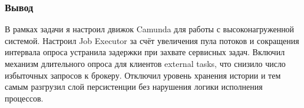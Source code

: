 \subsubsection{Вывод}

В рамках задачи я настроил движок Camunda для работы с высоконагруженной системой.
Настроил Job Executor за счёт увеличения пула потоков и сокращения интервала опроса устранила задержки при захвате сервисных задач.
Включил механизм длительного опроса для клиентов external tasks, что снизило число избыточных запросов к брокеру.
Отключил уровень хранения истории и тем самым разгрузил слой персистенции без нарушения логики исполнения процессов.
